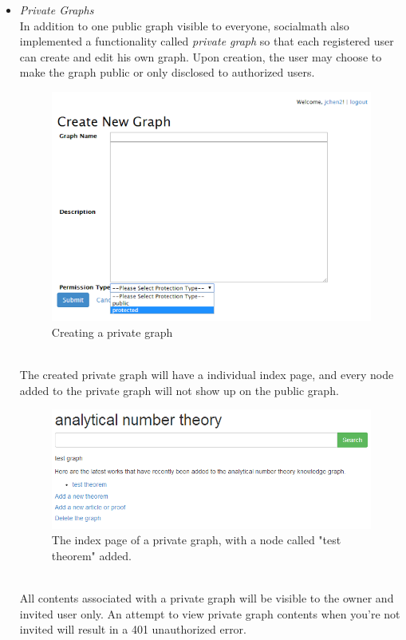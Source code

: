 \documentclass{acm_proc_article-sp}
\begin{document}
\begin{itemize}
\item \emph{Private Graphs} \\
In addition to one public graph visible to everyone, socialmath also implemented a functionality called \emph{private graph} so that each registered user can create and edit his own graph. Upon creation, the user may choose to make the graph public or only disclosed to authorized users. 
\begin{figure}[h!]
\centering
\includegraphics[scale=0.4]{create_pg.png}
\caption{Creating a private graph}
\end{figure}\\
The created private graph will have a individual index page, and every node added to the private graph will not show up on the public graph.  
\begin{figure}[h!]
\centering
\includegraphics[scale=0.4]{pg_index.png}
\caption{The index page of a private graph, with a node called "test theorem" added.}
\end{figure}\\
All contents associated with a private graph will be visible to the owner and invited user only. An attempt to view private graph contents when you're not invited will result in a 401 unauthorized error. 

\end{itemize}
\end{document}
